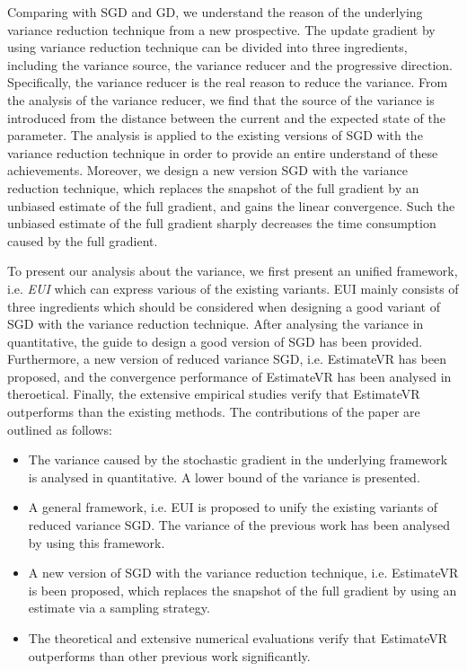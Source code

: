 \documentclass[letterpaper]{article}
\begin{document}
Comparing with SGD and GD, we  understand the reason of the underlying variance reduction technique from a new prospective. The  update gradient by using variance reduction technique can be divided into three ingredients, including the variance source, the variance reducer and the progressive direction. Specifically, the variance reducer is the real reason to reduce the variance. From the analysis of the variance reducer, we find that the source of the variance is introduced from  the distance between the current and  the expected state of the parameter. The analysis is applied to the existing versions of SGD with the variance reduction technique in order to provide an entire understand of these achievements. Moreover, we design a new version SGD with the variance reduction technique, which replaces the snapshot of the full gradient by an unbiased estimate of the  full gradient, and gains the linear convergence. Such the unbiased estimate of the full gradient sharply decreases the time consumption caused by  the full gradient.

To present our analysis about the variance, we first present an unified  framework, i.e. \emph{EUI}  which can express various of the  existing variants. EUI mainly consists of three ingredients which should be considered when  designing a good variant of SGD with the variance reduction technique. After analysing the variance in quantitative,  the guide to design a good version of SGD has been provided. Furthermore, a new version of reduced variance SGD, i.e. EstimateVR has been proposed, and the convergence performance of EstimateVR has been analysed in theroetical. Finally, the extensive empirical studies verify that EstimateVR outperforms than the existing methods. The contributions of the paper are outlined as follows:

\begin{itemize}
\item The variance caused by the stochastic gradient in the underlying framework is analysed in quantitative. A lower bound of the variance is presented.
\item A general framework, i.e. EUI is proposed to unify the existing variants of reduced variance SGD. The variance of the previous work has been analysed by using this framework.
\item A new version of SGD with the variance reduction technique, i.e. EstimateVR is been proposed, which replaces the snapshot of the full gradient by using an estimate via a sampling strategy.
\item The theoretical and extensive numerical evaluations verify that EstimateVR outperforms than other previous work significantly. 
\end{itemize}
 
\end{document}
